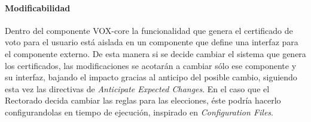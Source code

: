 \paragraph{Modificabilidad}
Dentro del componente VOX-core la funcionalidad que genera el certificado de voto para el usuario está aislada en un componente que define una interfaz para el componente externo. De esta manera si se decide cambiar el sistema que genera los certificados, las modificaciones se acotarán a cambiar sólo ese componente y su interfaz, bajando el impacto gracias al anticipo del posible cambio, siguiendo esta vez las directivas de \textit{Anticipate Expected Changes}. En el caso que el Rectorado decida cambiar las reglas para las elecciones, éste podría hacerlo configurandolas en tiempo de ejecución, inspirado en \textit{Configuration Files}.


